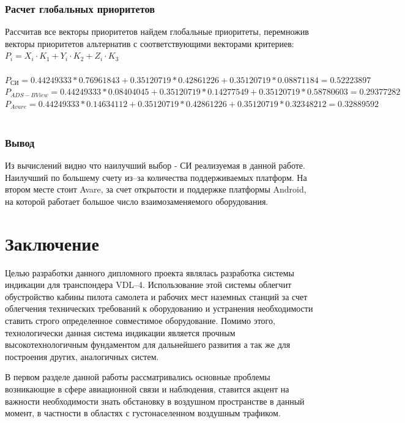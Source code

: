 \documentclass[a4paper,12pt]{report} %
\begin{document}
\subsection{Расчет глобальных приоритетов}

Рассчитав все векторы приоритетов найдем глобальные приоритеты, перемножив
векторы приоритетов альтернатив с соответствующими векторами критериев:\\

$P_i=X_i \cdot K_1 + Y_i \cdot K_2 + Z_i \cdot K_3 $ \\
\\
$P_{СИ} = 0.44249333 * 0.76961843 + 0.35120719 * 0.42861226 + 0.35120719 *
0.08871184 = 0.52223897$ \\
$P_{ADS-B View} = 0.44249333 * 0.08404045 + 0.35120719 * 0.14277549 + 0.35120719
* 0.58780603 = 0.29377282 $ \\
$P_{Avare} = 0.44249333 * 0.14634112 + 0.35120719 * 0.42861226 + 0.35120719 *
0.32348212 = 0.32889592$ \\
\\

\subsection{Вывод}

Из вычислений видно что наилучший выбор - СИ реализуемая в данной работе.
Наилучший по большему счету из--за количества поддерживаемых платформ. На втором
месте стоит Avare, за счет открытости и поддержке платформы Android, на которой
работает большое число взаимозаменяемого оборудования.

\newpage
\chapter*{Заключение}

Целью разработки данного дипломного проекта являлась разработка системы индикации
для транспондера VDL--4. Использование этой системы облегчит обустройство кабины
пилота самолета и рабочих мест наземных станций за счет облегчения технических
требований к оборудованию и устранения необходимости ставить строго определенное
совместимое оборудование. Помимо этого, технологически данная система индикации
является прочным высокотехнологичным фундаментом для дальнейшего развития а так
же для построения других, аналогичных систем.

В первом разделе данной работы рассматривались основные проблемы возникающие в
сфере авиационной связи и наблюдения, ставится акцент на важности необходимости
знать обстановку в воздушном пространстве в данный момент, в частности в
областях с густонаселенном воздушным трафиком.
\end{document}
